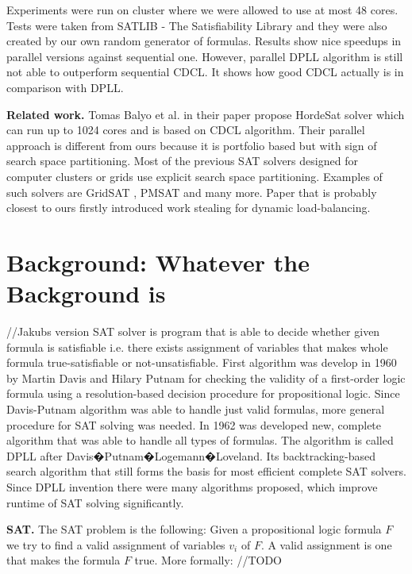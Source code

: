 \documentclass[letterpaper]{article}
\newcommand{\mypar}[1]{{\bf #1.}}
\begin{document}
Experiments were run on cluster where we were allowed to use at most 48 cores. Tests were taken from SATLIB - The Satisfiability Library \cite{cnf_website} and they were also created by our own random generator of formulas. Results show nice speedups in parallel versions against sequential one. However, parallel DPLL algorithm is still not able to outperform sequential CDCL. It shows how good CDCL actually is in comparison with DPLL. 

\mypar{Related work} Tomas Balyo et al. in their paper \cite{hordesat} propose HordeSat solver which can run up to 1024 cores and is based on CDCL algorithm. Their parallel approach is different from ours because it is portfolio based but with sign of search space partitioning. Most of the previous SAT solvers designed for computer clusters or grids use explicit search space partitioning. Examples of such solvers are GridSAT \cite{gridsat}, PMSAT \cite{pmsat} and many more. Paper that is probably closest to ours \cite{stealing} firstly introduced work stealing for dynamic load-balancing. 

\section{Background: Whatever the Background is}\label{sec:background}

//Jakubs version
SAT solver is program that is able to decide whether given formula is satisfiable i.e. there exists assignment of variables that makes whole formula true-satisfiable or not-unsatisfiable.
First algorithm was develop in 1960 by Martin Davis and Hilary Putnam for checking the validity of a first-order logic formula using a resolution-based decision procedure for propositional logic.
Since Davis-Putnam algorithm was able to handle just valid formulas, more general procedure for SAT solving was needed. In 1962 was developed new, complete algorithm that was able to handle all types of formulas. The algorithm is called DPLL after Davis�Putnam�Logemann�Loveland. Its  backtracking-based search algorithm that still forms the basis for most efficient complete SAT solvers. Since DPLL invention there were many algorithms proposed, which improve runtime of SAT solving significantly.

\mypar{SAT}
The SAT problem is the following:
Given a propositional logic formula $F$ we try to find a valid assignment of variables $v_i$ of $F$.
A valid assignment is one that makes the formula $F$ true.
More formally: //TODO
\end{document}
